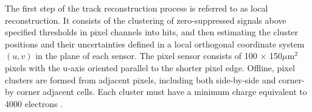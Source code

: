 The first step of the track reconstruction process is referred to as local reconstruction. It consists of the clustering of zero-suppressed signals above specified thresholds in pixel channels into hits, and then estimating the cluster positions and their uncertainties defined in a local orthogonal coordinate system $(u,v)$ in the plane of each sensor. The pixel sensor consists of 100 $\times$ 150$\mu \text{m}^{2}$ pixels with the u-axis oriented parallel to the shorter pixel edge. Offline, pixel clusters are formed from adjacent pixels, including both side-by-side and corner-by corner adjacent cells. Each cluster must have a minimum charge equivalent to 4000 electrons \cite{Track_Reco_2014}.
